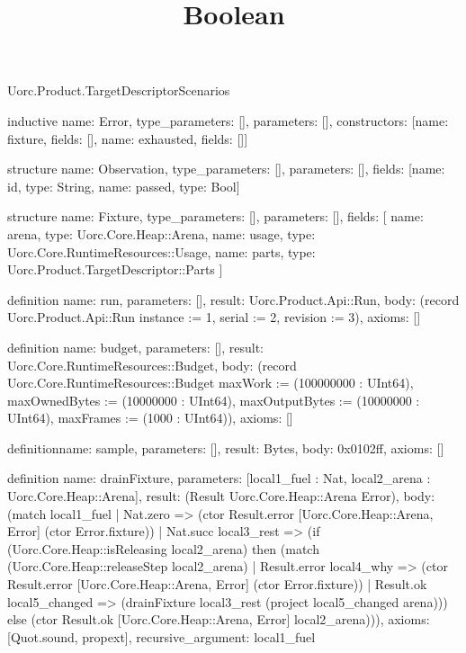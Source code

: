 \begin{lexlean}{Uorc.Product.TargetDescriptorScenarios}
\title{Boolean}
\begin{semanticmodule}
inductive{
  name: Error,
  type_parameters: [],
  parameters: [],
  constructors: [{name: fixture, fields: []}, {name: exhausted, fields: []}]
}

structure{
  name: Observation,
  type_parameters: [],
  parameters: [],
  fields: [{name: id, type: String}, {name: passed, type: Bool}]
}

structure{
  name: Fixture,
  type_parameters: [],
  parameters: [],
  fields: [
    {name: arena, type: Uorc.Core.Heap::Arena},
    {name: usage, type: Uorc.Core.RuntimeResources::Usage},
    {name: parts, type: Uorc.Product.TargetDescriptor::Parts}
  ]
}

definition{
  name: run,
  parameters: [],
  result: Uorc.Product.Api::Run,
  body: (record Uorc.Product.Api::Run {instance := 1, serial := 2, revision := 3}),
  axioms: []
}

definition{
  name: budget,
  parameters: [],
  result: Uorc.Core.RuntimeResources::Budget,
  body: (record Uorc.Core.RuntimeResources::Budget {maxWork := (100000000 : UInt64), maxOwnedBytes := (10000000 : UInt64), maxOutputBytes := (10000000 : UInt64), maxFrames := (1000 : UInt64)}),
  axioms: []
}

definition{name: sample, parameters: [], result: Bytes, body: 0x0102ff, axioms: []}

definition{
  name: drainFixture,
  parameters: [local1_fuel : Nat, local2_arena : Uorc.Core.Heap::Arena],
  result: (Result Uorc.Core.Heap::Arena Error),
  body: (match local1_fuel
    | Nat.zero => (ctor Result.error [Uorc.Core.Heap::Arena, Error] (ctor Error.fixture))
    | Nat.succ local3_rest => (if (Uorc.Core.Heap::isReleasing local2_arena) then (match (Uorc.Core.Heap::releaseStep local2_arena)
      | Result.error local4_why => (ctor Result.error [Uorc.Core.Heap::Arena, Error] (ctor Error.fixture))
      | Result.ok local5_changed => (drainFixture local3_rest (project local5_changed arena))) else (ctor Result.ok [Uorc.Core.Heap::Arena, Error] local2_arena))),
  axioms: [Quot.sound, propext],
  recursive_argument: local1_fuel
}


\end{semanticmodule}
\end{lexlean}
